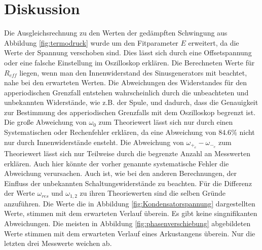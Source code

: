 \section{Diskussion}
\label{sec:Diskussion}
Die Ausgleichsrechnung zu den Werten der gedämpften Schwingung aus Abbildung
\ref{fig:termodruck} wurde um den Fitparameter $E$ erweitert, da die Werte
der Spannung verschoben sind. Dies lässt sich durch eine Offsetspannung oder
eine falsche Einstellung im Oszilloskop erklären.
Die Berechneten Werte für $R_{eff}$ liegen, wenn man den Innenwiderstand des
Sinusgenerators mit beachtet, nahe bei den erwarteten Werten. Die
Abweichungen des Widerstandes für den apperiodischen Grenzfall entstehen
wahrscheinlich durch die unbeachteten und unbekannten Widerstände, wie z.B.
der Spule, und dadurch, dass die Genauigkeit zur Bestimmung des apperiodischen
Grenzfalls mit dem Oszilloskop begrenzt ist.
Die große Abweichung von $\omega_0$
zum Theoriewert lässt sich nur durch einen Systematischen oder Rechenfehler erklären,
da eine Abweichung von $84.6\%$ nicht nur durch Innenwiderstände ensteht.
Die Abweichung von
$\omega_{+_e}-\omega_{-_e}$ zum Theoriewert lässt sich nur Teilweise durch die
begrenzte Anzahl an Messwerten erklären.
 Auch hier könnte der vorher genannte systematische Fehler die Abweichung verursachen.
Auch ist, wie bei den anderen Berechnungen, der Einfluss der unbekannten
Schaltungswiderstände zu beachten.
Für die Differenz der Werte $\omega_{res}$ und $\omega_{1,2} $ zu ihren Theoriewerten
sind die selben Gründe anzuführen.
Die Werte die in Abbildung \ref{fig:Kondensatorspannung} dargestellten Werte,
stimmen mit dem erwarteten Verlauf überein. Es gibt keine singnifikanten
Abweichungen.
Die meisten in Abbildung \ref{fig:phasenverschiebung} abgebildeten Werte stimmen mit dem
erwarteten Verlauf eines Arkustangens überein. Nur die letzten drei Messwerte
weichen ab. 
